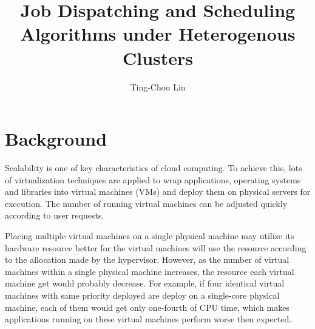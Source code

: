 \documentclass[11pt]{article}
\title{\textbf{Job Dispatching and Scheduling Algorithms under Heterogenous Clusters}}
\author{Ting-Chou Lin\\}
\date{}
\begin{document}
\maketitle

\section{Background}

Scalability is one of key characteristics of cloud computing.  To
achieve this, lots of virtualization
techniques\cite{secure_virt_for_cloud}\cite{cloud_issue} are applied to
wrap applications, operating systems and libraries into virtual
machines (VMs) and deploy them on physical servers for execution.  The
number of running virtual machines can be adjusted quickly according to
user requests.  

Placing multiple virtual machines on a single physical machine may
utilize its hardware resource better for the virtual machines will use
the resource according to the allocation made by the hypervisor.
However, as the number of virtual machines within a single physical
machine increases, the resource each virtual machine get would probably
decrease\cite{resource_overbooking}.  For example, if four identical
virtual machines with same priority deployed are deploy on a single-core
physical machine, each of them would get only one-fourth of CPU time,
which makes applications running on these virtual machines perform
worse then expected.


\renewcommand\refname{Reference}


\end{document}
